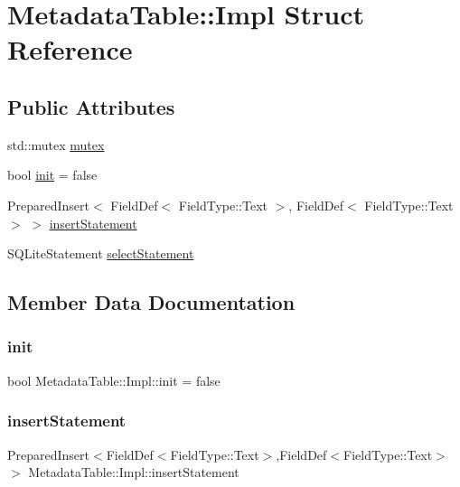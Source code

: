 \hypertarget{struct_metadata_table_1_1_impl}{}\section{Metadata\+Table\+::Impl Struct Reference}
\label{struct_metadata_table_1_1_impl}
\subsection*{Public Attributes}
\begin{DoxyCompactItemize}
\item 
std\+::mutex \mbox{\hyperlink{struct_metadata_table_1_1_impl_a68358a10929b133fcffa243a8521bc87}{mutex}}
\item 
bool \mbox{\hyperlink{struct_metadata_table_1_1_impl_a5134e0472f469f68699dcc1bc4bd067b}{init}} = false
\item 
Prepared\+Insert$<$ Field\+Def$<$ Field\+Type\+::\+Text $>$, Field\+Def$<$ Field\+Type\+::\+Text $>$ $>$ \mbox{\hyperlink{struct_metadata_table_1_1_impl_a2f7365971a2ca729ba01735ff21704d6}{insert\+Statement}}
\item 
S\+Q\+Lite\+Statement \mbox{\hyperlink{struct_metadata_table_1_1_impl_ac28b3baeed0ac96546d1f08e7f5f07b2}{select\+Statement}}
\end{DoxyCompactItemize}


\subsection{Member Data Documentation}
\mbox{\label{struct_metadata_table_1_1_impl_a5134e0472f469f68699dcc1bc4bd067b}} 
\subsubsection{\texorpdfstring{init}{init}}
{\footnotesize\ttfamily bool Metadata\+Table\+::\+Impl\+::init = false}

\mbox{\label{struct_metadata_table_1_1_impl_a2f7365971a2ca729ba01735ff21704d6}} 
\subsubsection{\texorpdfstring{insertStatement}{insertStatement}}
{\footnotesize\ttfamily Prepared\+Insert$<$Field\+Def$<$Field\+Type\+::\+Text$>$,Field\+Def$<$Field\+Type\+::\+Text$>$ $>$ Metadata\+Table\+::\+Impl\+::insert\+Statement}

